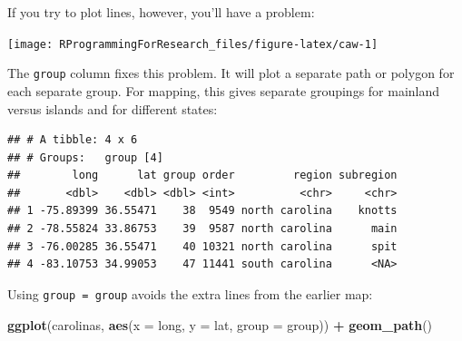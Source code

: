 \documentclass[]{book}
\makeatletter
\newenvironment{Shaded}{\begin{snugshade}}{\end{snugshade}}
\newcommand{\KeywordTok}[1]{\textcolor[rgb]{0.13,0.29,0.53}{\textbf{#1}}}
\newcommand{\DataTypeTok}[1]{\textcolor[rgb]{0.13,0.29,0.53}{#1}}
\newcommand{\DecValTok}[1]{\textcolor[rgb]{0.00,0.00,0.81}{#1}}
\newcommand{\StringTok}[1]{\textcolor[rgb]{0.31,0.60,0.02}{#1}}
\newcommand{\OperatorTok}[1]{\textcolor[rgb]{0.81,0.36,0.00}{\textbf{#1}}}
\newcommand{\NormalTok}[1]{#1}
\newenvironment{kframe}{%
\medskip{}
\setlength{\fboxsep}{.8em}
 \def\at@end@of@kframe{}%
 \ifinner\ifhmode%
  \def\at@end@of@kframe{\end{minipage}}%
  \begin{minipage}{\columnwidth}%
 \fi\fi%
 \def\FrameCommand##1{\hskip\@totalleftmargin \hskip-\fboxsep
 \colorbox{shadecolor}{##1}\hskip-\fboxsep
     \hskip-\linewidth \hskip-\@totalleftmargin \hskip\columnwidth}%
 \MakeFramed {\advance\hsize-\width
   \@totalleftmargin\z@ \linewidth\hsize
   \@setminipage}}%
 {\par\unskip\endMakeFramed%
 \at@end@of@kframe}
\renewenvironment{Shaded}{\begin{kframe}}{\end{kframe}}
\theoremstyle{definition}
\theoremstyle{definition}
\theoremstyle{definition}
\theoremstyle{remark}
\makeatother
\begin{document}
If you try to plot lines, however, you'll have a problem:

\begin{Shaded}
\end{Shaded}

\begin{center}\texttt{[image: RProgrammingForResearch\_files/figure-latex/caw-1]} \end{center}

The \texttt{group} column fixes this problem. It will plot a separate
path or polygon for each separate group. For mapping, this gives
separate groupings for mainland versus islands and for different states:

\begin{Shaded}
\end{Shaded}

\begin{verbatim}
## # A tibble: 4 x 6
## # Groups:   group [4]
##        long      lat group order         region subregion
##       <dbl>    <dbl> <dbl> <int>          <chr>     <chr>
## 1 -75.89399 36.55471    38  9549 north carolina    knotts
## 2 -78.55824 33.86753    39  9587 north carolina      main
## 3 -76.00285 36.55471    40 10321 north carolina      spit
## 4 -83.10753 34.99053    47 11441 south carolina      <NA>
\end{verbatim}

Using \texttt{group\ =\ group} avoids the extra lines from the earlier
map:

\begin{Shaded}
\begin{Highlighting}[]
\KeywordTok{ggplot}\NormalTok{(carolinas, }\KeywordTok{aes}\NormalTok{(}\DataTypeTok{x =}\NormalTok{ long, }\DataTypeTok{y =}\NormalTok{ lat,}
                      \DataTypeTok{group =}\NormalTok{ group)) }\OperatorTok{+}\StringTok{ }
\StringTok{  }\KeywordTok{geom_path}\NormalTok{()}
\end{Highlighting}
\end{Shaded}
\end{document}
